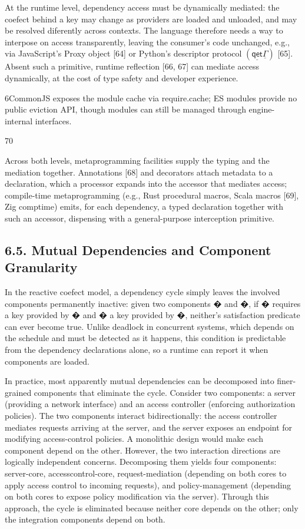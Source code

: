 \documentclass[
  10
]{article}
\begin{document}
At the runtime level, dependency access must be dynamically mediated:
the coefect behind a key may change as providers are loaded and
unloaded, and may be resolved diferently across contexts. The language
therefore needs a way to interpose on access transparently, leaving the
consumer's code unchanged, e.g., via JavaScript's Proxy object {[}64{]}
or Python's descriptor protocol
\(\left( \underline { { \mathsf { q e t } } } \underline { { \mathsf { \Gamma } } } \right)\)
{[}65{]}. Absent such a primitive, runtime reflection {[}66, 67{]} can
mediate access dynamically, at the cost of type safety and developer
experience.

6CommonJS exposes the module cache via require.cache; ES modules provide
no public eviction API, though modules can still be managed through
engine-internal interfaces.

70

Across both levels, metaprogramming facilities supply the typing and the
mediation together. Annotations {[}68{]} and decorators attach metadata
to a declaration, which a processor expands into the accessor that
mediates access; compile-time metaprogramming (e.g., Rust procedural
macros, Scala macros {[}69{]}, Zig comptime) emits, for each dependency,
a typed declaration together with such an accessor, dispensing with a
general-purpose interception primitive.

\subsection{6.5. Mutual Dependencies and Component
Granularity}\label{mutual-dependencies-and-component-granularity}

In the reactive coefect model, a dependency cycle simply leaves the
involved components permanently inactive: given two components � and �,
if � requires a key provided by � and � a key provided by �, neither's
satisfaction predicate can ever become true. Unlike deadlock in
concurrent systems, which depends on the schedule and must be detected
as it happens, this condition is predictable from the dependency
declarations alone, so a runtime can report it when components are
loaded.

In practice, most apparently mutual dependencies can be decomposed into
finer-grained components that eliminate the cycle. Consider two
components: a server (providing a network interface) and an access
controller (enforcing authorization policies). The two components
interact bidirectionally: the access controller mediates requests
arriving at the server, and the server exposes an endpoint for modifying
access-control policies. A monolithic design would make each component
depend on the other. However, the two interaction directions are
logically independent concerns. Decomposing them yields four components:
server-core, accesscontrol-core, request-mediation (depending on both
cores to apply access control to incoming requests), and
policy-management (depending on both cores to expose policy modification
via the server). Through this approach, the cycle is eliminated because
neither core depends on the other; only the integration components
depend on both.
\end{document}
